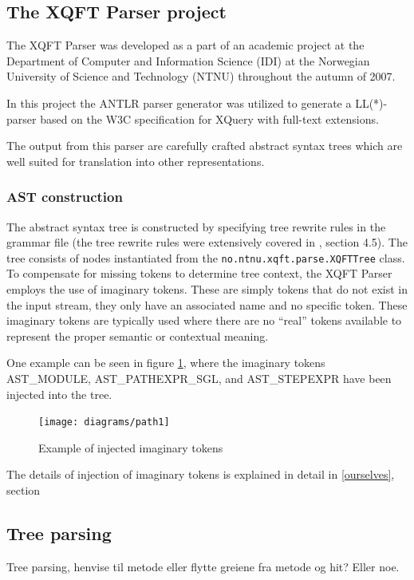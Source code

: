 \subsection{The XQFT Parser project}
\label{sect:theory:xqftparser}
The XQFT Parser\cite{ourselves} was developed as a part of an academic project
at the Department of Computer and Information Science (IDI) at the Norwegian
University of Science and Technology (NTNU) throughout the autumn of 2007.

In this project the ANTLR parser generator was utilized to generate a
LL(*)-parser based on the W3C specification\cite{w3c01} for XQuery with
full-text extensions.

The output from this parser are carefully crafted abstract syntax trees which
are well suited for translation into other representations.

\subsubsection{AST construction}
The abstract syntax tree is constructed by specifying tree rewrite rules in the
grammar file (the tree rewrite rules were extensively covered in \cite{ourselves}, section
4.5). The tree consists of nodes instantiated from the
\verb!no.ntnu.xqft.parse.XQFTTree! class. To compensate for missing tokens to
determine tree context, the XQFT Parser employs the use of imaginary tokens.
These are simply tokens that do not exist in the input stream, they only have
an associated name and no specific token. These imaginary tokens are typically
used where there are no ``real'' tokens available to represent the proper
semantic or contextual meaning.

One example can be seen in figure \ref{figure:parser:imaginary_tokens_path},
where the imaginary tokens AST_MODULE, AST_PATHEXPR_SGL, and AST_STEPEXPR have
been injected into the tree.

\begin{figure}[h]
  \centering
    \texttt{[image: diagrams/path1]}
  \caption{Example of injected imaginary tokens}
  \label{figure:parser:imaginary_tokens_path}
\end{figure}

The details of injection of imaginary tokens is explained in detail in
\ref{ourselves}, section 

\subsection{Tree parsing}
Tree parsing, henvise til metode eller flytte greiene fra metode og hit? Eller
noe.

